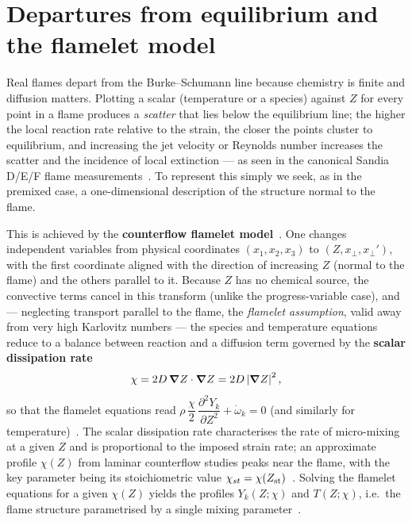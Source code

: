 \section{Departures from equilibrium and the flamelet model}

Real flames depart from the Burke--Schumann line because chemistry is finite and diffusion matters. Plotting a scalar (temperature or a species) against $Z$ for every point in a flame produces a \emph{scatter} that lies below the equilibrium line; the higher the local reaction rate relative to the strain, the closer the points cluster to equilibrium, and increasing the jet velocity or Reynolds number increases the scatter and the incidence of local extinction --- as seen in the canonical Sandia D/E/F flame measurements~\cite{lecture9}. To represent this simply we seek, as in the premixed case, a one-dimensional description of the structure normal to the flame.

This is achieved by the \textbf{counterflow flamelet model}~\cite{lecture9,peters2000turbulent}. One changes independent variables from physical coordinates $(x_1,x_2,x_3)$ to $(Z,x_\perp,x_\perp')$, with the first coordinate aligned with the direction of increasing $Z$ (normal to the flame) and the others parallel to it. Because $Z$ has no chemical source, the convective terms cancel in this transform (unlike the progress-variable case), and --- neglecting transport parallel to the flame, the \emph{flamelet assumption}, valid away from very high Karlovitz numbers --- the species and temperature equations reduce to a balance between reaction and a diffusion term governed by the \textbf{scalar dissipation rate}
\begin{equation}
\chi=2D\,\boldsymbol{\nabla} Z\cdot\boldsymbol{\nabla} Z=2D\left|\boldsymbol{\nabla} Z\right|^2 ,
\label{eq:chi}
\end{equation}
so that the flamelet equations read $\rho\,\dfrac{\chi}{2}\,\dfrac{\partial^2 Y_k}{\partial Z^2}+\dot\omega_k=0$ (and similarly for temperature)~\cite{lecture9}. The scalar dissipation rate characterises the rate of micro-mixing at a given $Z$ and is proportional to the imposed strain rate; an approximate profile $\chi(Z)$ from laminar counterflow studies peaks near the flame, with the key parameter being its stoichiometric value $\chi_{st}=\chi(Z_{\mathrm{st}})$~\cite{lecture9,poinsot2011theoretical}. Solving the flamelet equations for a given $\chi(Z)$ yields the profiles $Y_k(Z;\chi)$ and $T(Z;\chi)$, i.e.\ the flame structure parametrised by a single mixing parameter~\cite{lecture9}.


